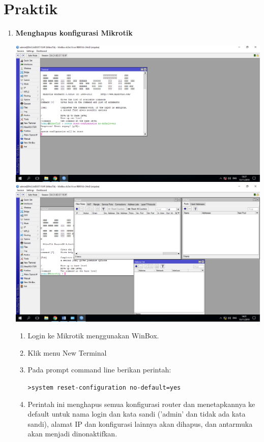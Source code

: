 \documentclass[a4paper,12pt]{article}
\begin{document}
\section{Praktik}
\begin{enumerate}
	\item {\bfseries Menghapus konfigurasi Mikrotik
}
	\begin{center}
	\includegraphics[scale=.4]{Page-1-Image-1}
	\includegraphics[scale=.4]{Page-1-Image-2}
	\end{center}	
	\begin{enumerate}[label=\alph*.]
		\item Login ke Mikrotik menggunakan WinBox.
		
		\item Klik menu New Terminal
		
		\item Pada prompt command line berikan perintah:
		
		\texttt{>system reset-configuration no-default=yes}
		
		\item Perintah ini menghapus semua konfigurasi router dan menetapkannya ke default untuk nama login dan kata sandi ('admin' dan tidak ada kata sandi), alamat IP dan konfigurasi lainnya akan dihapus, dan antarmuka akan menjadi dinonaktifkan.
		

\end{enumerate}
\end{enumerate}
\end{document}
